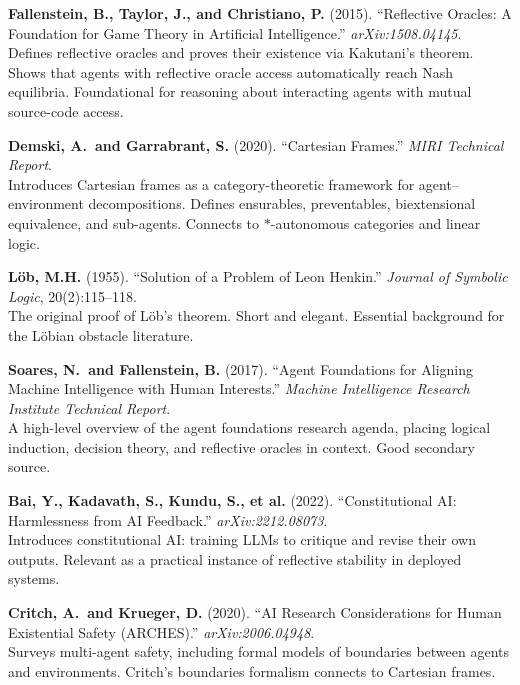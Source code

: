 \documentclass[11pt,a4paper]{article}
\theoremstyle{definition}
\theoremstyle{remark}
\begin{document}
\begin{enumerate}[label={[\arabic*]},leftmargin=2em]
\item \label{bib:fallenstein2015} \textbf{Fallenstein, B., Taylor, J.,
  and Christiano, P.} (2015). ``Reflective Oracles: A Foundation for
  Game Theory in Artificial Intelligence.'' \textit{arXiv:1508.04145}.\\
  Defines reflective oracles and proves their existence via Kakutani's
  theorem.  Shows that agents with reflective oracle access automatically
  reach Nash equilibria.  Foundational for reasoning about interacting
  agents with mutual source-code access.

\item \label{bib:demski2020} \textbf{Demski, A.\ and Garrabrant, S.}
  (2020). ``Cartesian Frames.'' \textit{MIRI Technical Report}.\\
  Introduces Cartesian frames as a category-theoretic framework for
  agent--environment decompositions.  Defines ensurables, preventables,
  biextensional equivalence, and sub-agents.  Connects to $*$-autonomous
  categories and linear logic.

\item \label{bib:lob1955} \textbf{L\"ob, M.H.} (1955). ``Solution of a
  Problem of Leon Henkin.'' \textit{Journal of Symbolic Logic},
  20(2):115--118.\\
  The original proof of L\"ob's theorem.  Short and elegant.  Essential
  background for the L\"obian obstacle literature.

\item \label{bib:soares2015agent} \textbf{Soares, N.\ and Fallenstein,
  B.} (2017). ``Agent Foundations for Aligning Machine Intelligence with
  Human Interests.'' \textit{Machine Intelligence Research Institute
  Technical Report}.\\
  A high-level overview of the agent foundations research agenda, placing
  logical induction, decision theory, and reflective oracles in context.
  Good secondary source.

\item \label{bib:bai2022} \textbf{Bai, Y., Kadavath, S., Kundu, S.,
  et al.} (2022). ``Constitutional AI: Harmlessness from AI Feedback.''
  \textit{arXiv:2212.08073}.\\
  Introduces constitutional AI: training LLMs to critique and revise
  their own outputs.  Relevant as a practical instance of reflective
  stability in deployed systems.

\item \label{bib:critch2020} \textbf{Critch, A.\ and Krueger, D.}
  (2020). ``AI Research Considerations for Human Existential Safety
  (ARCHES).'' \textit{arXiv:2006.04948}.\\
  Surveys multi-agent safety, including formal models of boundaries
  between agents and environments.  Critch's boundaries formalism
  connects to Cartesian frames.


\end{enumerate}
\end{document}
